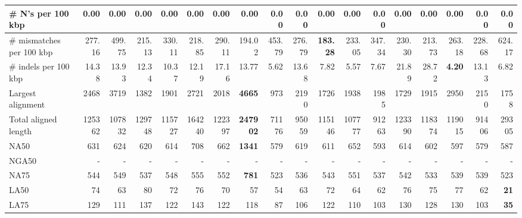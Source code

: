 \documentclass[12pt,a4paper]{article}
\begin{document}
\begin{table}[ht]
\begin{center}
\begin{tabular}{|l*{17}{|r}|}
\# N's per 100 kbp & 0.00 & 0.00 & 0.00 & 0.00 & 0.00 & 0.00 & 0.00 & 0.00 & 0.00 & 0.00 & 0.00 & 0.00 & 0.00 & 0.00 & 0.00 & 0.00 & 0.00 \\ \hline
\# mismatches per 100 kbp & 277.16 & 499.75 & 215.13 & 330.11 & 218.85 & 290.11 & 194.02 & 453.79 & 276.79 & {\bf 183.28} & 233.05 & 347.34 & 230.30 & 213.73 & 263.18 & 228.68 & 624.17 \\ \hline
\# indels per 100 kbp & 14.38 & 13.93 & 12.34 & 10.37 & 12.19 & 17.16 & 13.77 & 5.62 & 13.68 & 7.82 & 5.57 & 7.67 & 21.89 & 28.72 & {\bf 4.20} & 13.13 & 6.82 \\ \hline
Largest alignment & 2468 & 3719 & 1382 & 1901 & 2721 & 2018 & {\bf 4665} & 973 & 2190 & 1726 & 1938 & 1985 & 1729 & 1915 & 2950 & 2150 & 1758 \\ \hline
Total aligned length & 125362 & 107832 & 129748 & 115727 & 164240 & 122397 & {\bf 247902} & 71176 & 95059 & 115146 & 107777 & 91263 & 123390 & 118374 & 119015 & 91406 & 29305 \\ \hline
NA50 & 631 & 624 & 620 & 614 & 708 & 662 & {\bf 1341} & 579 & 619 & 611 & 652 & 593 & 614 & 602 & 597 & 579 & 587 \\ \hline
NGA50 & - & - & - & - & - & - & - & - & - & - & - & - & - & - & - & - & - \\ \hline
NA75 & 544 & 549 & 537 & 548 & 555 & 552 & {\bf 781} & 523 & 536 & 543 & 551 & 537 & 542 & 533 & 539 & 539 & 523 \\ \hline
LA50 & 74 & 63 & 80 & 72 & 76 & 70 & 57 & 54 & 63 & 72 & 64 & 62 & 76 & 75 & 77 & 62 & {\bf 21} \\ \hline
LA75 & 129 & 111 & 137 & 122 & 143 & 122 & 118 & 87 & 106 & 122 & 110 & 103 & 130 & 128 & 130 & 103 & {\bf 35} \\ \hline
\end{tabular}
\end{center}
\end{table}
\end{document}
